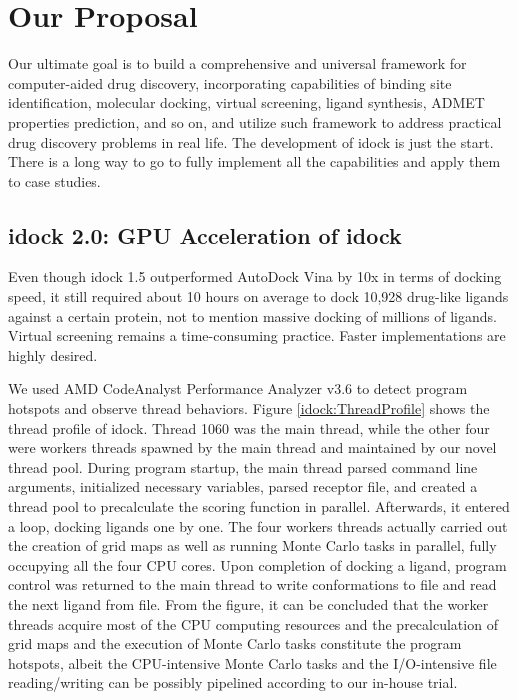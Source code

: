 \chapter{Our Proposal}

Our ultimate goal is to build a comprehensive and universal framework for computer-aided drug discovery, incorporating capabilities of binding site identification, molecular docking, virtual screening, ligand synthesis, ADMET properties prediction, and so on, and utilize such framework to address practical drug discovery problems in real life. The development of idock is just the start. There is a long way to go to fully implement all the capabilities and apply them to case studies.

\section{idock 2.0: GPU Acceleration of idock}

Even though idock 1.5 outperformed AutoDock Vina \citep{595} by 10x in terms of docking speed, it still required about 10 hours on average to dock 10,928 drug-like ligands against a certain protein, not to mention massive docking of millions of ligands. Virtual screening remains a time-consuming practice. Faster implementations are highly desired.

We used AMD CodeAnalyst Performance Analyzer v3.6 to detect program hotspots and observe thread behaviors. Figure \ref{idock:ThreadProfile} shows the thread profile of idock. Thread 1060 was the main thread, while the other four were workers threads spawned by the main thread and maintained by our novel thread pool. During program startup, the main thread parsed command line arguments, initialized necessary variables, parsed receptor file, and created a thread pool to precalculate the scoring function in parallel. Afterwards, it entered a loop, docking ligands one by one. The four workers threads actually carried out the creation of grid maps as well as running Monte Carlo tasks in parallel, fully occupying all the four CPU cores. Upon completion of docking a ligand, program control was returned to the main thread to write conformations to file and read the next ligand from file. From the figure, it can be concluded that the worker threads acquire most of the CPU computing resources and the precalculation of grid maps and the execution of Monte Carlo tasks constitute the program hotspots, albeit the CPU-intensive Monte Carlo tasks and the I/O-intensive file reading/writing can be possibly pipelined according to our in-house trial.

